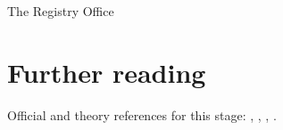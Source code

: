 \begin{ledger}{The Registry Office}
\end{ledger}

\section{Further reading}
\label{sec:registry_office:further_reading}
Official and theory references for this stage: \cite{CMS:2017wtu}, \cite{Bols:2020bkb}, \cite{Qu:2019gqs}, \cite{CMS:2012feb}.

\begin{pitfalls}
\end{pitfalls}

\begin{exercises}
\item {}
\item {}
\end{exercises}
